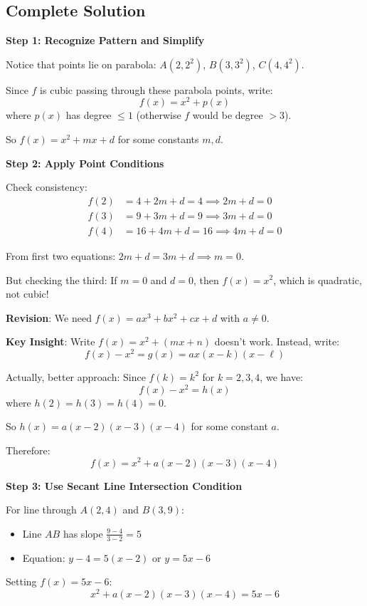 \documentclass[]{article}
\begin{document}
\begin{solutionbox}
\subsection*{Complete Solution}

\textbf{Step 1: Recognize Pattern and Simplify}

Notice that points lie on parabola: $A(2, 2^2)$, $B(3, 3^2)$, $C(4, 4^2)$.

Since $f$ is cubic passing through these parabola points, write:
\[f(x) = x^2 + p(x)\]
where $p(x)$ has degree $\leq 1$ (otherwise $f$ would be degree $>3$).

So $f(x) = x^2 + mx + d$ for some constants $m, d$.

\textbf{Step 2: Apply Point Conditions}

Check consistency:
\begin{align*}
f(2) &= 4 + 2m + d = 4 \implies 2m + d = 0 \\
f(3) &= 9 + 3m + d = 9 \implies 3m + d = 0 \\
f(4) &= 16 + 4m + d = 16 \implies 4m + d = 0
\end{align*}

From first two equations: $2m + d = 3m + d \implies m = 0$.

But checking the third: If $m = 0$ and $d = 0$, then $f(x) = x^2$, which is quadratic, not cubic!

\textbf{Revision}: We need $f(x) = ax^3 + bx^2 + cx + d$ with $a \neq 0$.

\textbf{Key Insight}: Write $f(x) = x^2 + (mx + n)$ doesn't work. Instead, write:
\[f(x) - x^2 = g(x) = ax(x-k)(x-\ell)\]

Actually, better approach: Since $f(k) = k^2$ for $k = 2, 3, 4$, we have:
\[f(x) - x^2 = h(x)\]
where $h(2) = h(3) = h(4) = 0$.

So $h(x) = a(x-2)(x-3)(x-4)$ for some constant $a$.

Therefore:
\[f(x) = x^2 + a(x-2)(x-3)(x-4)\]

\textbf{Step 3: Use Secant Line Intersection Condition}

For line through $A(2,4)$ and $B(3,9)$:
\begin{itemize}
    \item Line $AB$ has slope $\frac{9-4}{3-2} = 5$
    \item Equation: $y - 4 = 5(x-2)$ or $y = 5x - 6$
\end{itemize}

Setting $f(x) = 5x - 6$:
\[x^2 + a(x-2)(x-3)(x-4) = 5x - 6\]


\end{solutionbox}
\end{document}
